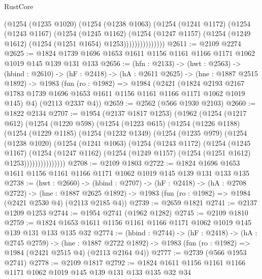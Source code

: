 \begin{lexlean}{RustCore}
\begin{coremodule}
                  (@1254
                    (@1235 @1020)
                    (@1254
                      (@1238 @1063)
                      (@1254
                        (@1241 @1172)
                        (@1254
                          (@1243 @1167)
                          (@1254
                            (@1245 @1162)
                            (@1254
                              (@1247 @1157)
                              (@1254 (@1249 @1612) (@1254 (@1251 @1654) @1253)))))))))))))))
@2611 := @2109 @2274
@2625 := @1824 @1739 @1696 @1653 @1611 @1156 @1161 @1166 @1171 @1062 @1019 @145 @139 @131 @133
@2656 := (hfn : @2133) ->
  (hwt : @2563) ->
  (hbind : @2610) ->
  (hF : @2418) ->
  (hA : @2611 @2625) ->
  (hne : @1887 @2515 @1892) ->
  @1983
    (fun (ro : @1982) =>
    @1984
      (@2421
        (@1824 @2193 @2167 @1783 @1739 @1696 @1653 @1611 @1156 @1161 @1166 @1171 @1062 @1019 @145)
        @4)
      (@2113 @2337 @4))
@2659 := @2562 (@566 @1930 @2103)
@2660 := @1822 @2134
@2707 := @1954
    (@2137 @1817 @1253)
    (@1962
      (@1254
        (@1217 @612)
        (@1254
          (@1220 @598)
          (@1254
            (@1223 @615)
            (@1254
              (@1226 @1188)
              (@1254
                (@1229 @1185)
                (@1254
                  (@1232 @1349)
                  (@1254
                    (@1235 @979)
                    (@1254
                      (@1238 @1020)
                      (@1254
                        (@1241 @1063)
                        (@1254
                          (@1243 @1172)
                          (@1254
                            (@1245 @1167)
                            (@1254
                              (@1247 @1162)
                              (@1254 (@1249 @1157) (@1254 (@1251 @1612) @1253)))))))))))))))
@2708 := @2109 @1803
@2722 := @1824 @1696 @1653 @1611 @1156 @1161 @1166 @1171 @1062 @1019 @145 @139 @131 @133 @135
@2738 := (hwt : @2660) ->
  (hbind : @2707) ->
  (hF : @2418) ->
  (hA : @2708 @2722) ->
  (hne : @1887 @2625 @1892) -> @1983 (fun (ro : @1982) => @1984 (@2421 @2530 @4) (@2113 @2185 @4))
@2739 := @2659 @1821
@2741 := @2137 @1209 @1253
@2744 := @1954 @2741 (@1962 @1282)
@2745 := @2109 @1810
@2759 := @1824 @1653 @1611 @1156 @1161 @1166 @1171 @1062 @1019 @145 @139 @131 @133 @135 @32
@2774 := (hbind : @2744) ->
  (hF : @2418) ->
  (hA : @2745 @2759) ->
  (hne : @1887 @2722 @1892) -> @1983 (fun (ro : @1982) => @1984 (@2421 @2515 @4) (@2113 @2164 @4))
@2777 := @2739 (@566 @1953 @2741)
@2778 := @2109 @1817
@2792 := @1824 @1611 @1156 @1161 @1166 @1171 @1062 @1019 @145 @139 @131 @133 @135 @32 @34

\end{coremodule}
\end{lexlean}
